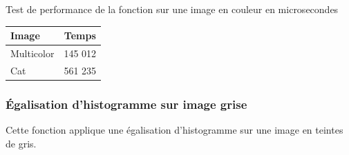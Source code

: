 \documentclass{article}
\begin{document}
\begin{center}
\medbreak
Test de performance de la fonction sur une image en couleur en microsecondes
\bigbreak
   \begin{tabular}{ | l | c | }
     \hline
     Image & Temps \\
     \hline
     Multicolor & 145 012 \\
     \hline
     Cat & 561 235 \\
     \hline
   \end{tabular}
 \end{center}
\bigbreak

\subsubsection{Égalisation d'histogramme sur image grise}

Cette fonction applique une égalisation d'histogramme sur une image en teintes de gris.
\end{document}
